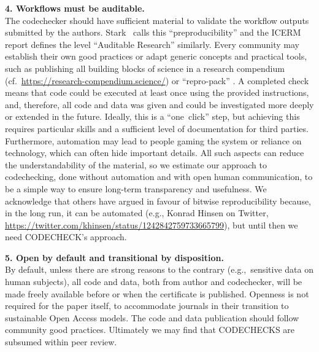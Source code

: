 \documentclass[12pt]{article}
\begin{document}
\textbf{4. Workflows must be auditable.} \\
The codechecker should have sufficient material to validate the
workflow outputs submitted by the
authors. Stark~\cite{stark_before_2018} calls this
``preproducibility'' and the ICERM report \cite{stodden_setting_2013}
defines the level ``Auditable Research'' similarly.  Every community
may establish their own good practices or adapt generic concepts and
practical tools, such as publishing all building blocks of science in
a research compendium (cf.~\url{https://research-compendium.science/})
or ``repro-pack'' \cite{barba_praxis_2018}.
A completed
check means that code could be executed at least once using the
provided instructions, and, therefore, all code and data was given and
could be investigated more deeply or extended in the future.  Ideally,
this is a ``one~click'' step, but achieving this requires particular
skills and a sufficient level of documentation for third
parties. Furthermore, automation may lead to people gaming the system
or reliance on technology, which can often hide important details.
All such aspects can reduce the understandability of the material, so
we estimate our approach to codechecking, done without automation and
with open human communication, to be a simple way to ensure long-term
transparency and usefulness.  We acknowledge that others have argued
in favour of bitwise reproducibility because, in the long run, it can
be automated (e.g., Konrad Hinsen on Twitter,
\url{https://twitter.com/khinsen/status/1242842759733665799}), but
until then we need CODECHECK's approach.

\textbf{5. Open by default and transitional by disposition.} \\
By default, unless there are strong reasons to the contrary
(e.g.,~sensitive data on human subjects), all code and data, both from
author and codechecker, will be made freely available before or when
the certificate is published.  Openness is not required for the paper
itself, to accommodate journals in their transition to sustainable
Open Access models.  The code and data publication should follow
community good practices.  Ultimately we may find that CODECHECKS are
subsumed within peer review.
\end{document}
